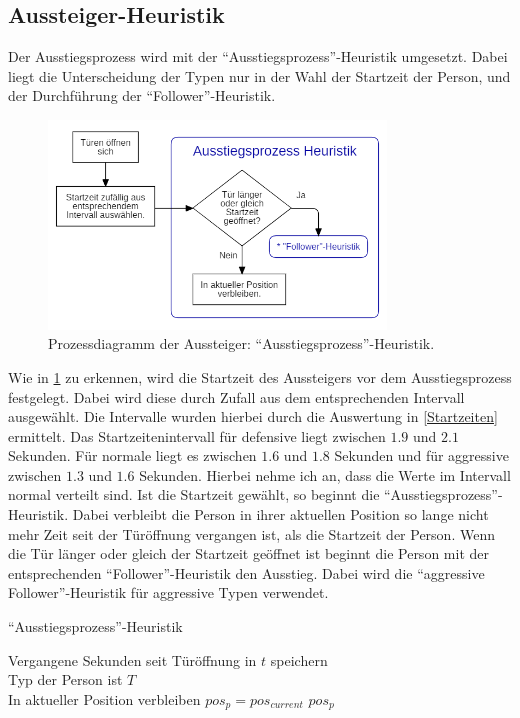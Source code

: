 \subsection{Aussteiger-Heuristik} \label{AM}
Der Ausstiegsprozess wird mit der "`Ausstiegsprozess"'-Heuristik umgesetzt. Dabei liegt die Unterscheidung der Typen nur in der Wahl der Startzeit der Person, und der Durchführung der "`Follower"'-Heuristik.
\begin{figure}[H]
	\centering
		\includegraphics[width=0.8\textwidth]{pictures/model/algorithm/alight/alight_process.png}
	\caption{Prozessdiagramm der Aussteiger: "`Ausstiegsprozess"'-Heuristik.}
	\label{fig:AH}
\end{figure}
Wie in \figurename \ref{fig:AH} zu erkennen, wird die Startzeit des Aussteigers vor dem Ausstiegsprozess festgelegt. Dabei wird diese durch Zufall aus dem entsprechenden Intervall ausgewählt. Die Intervalle wurden hierbei durch die Auswertung in \ref{Startzeiten} ermittelt. Das Startzeitenintervall für defensive liegt zwischen $1.9$ und $2.1$ Sekunden. Für normale liegt es zwischen $1.6$ und $1.8$ Sekunden und für aggressive zwischen $1.3$ und $1.6$ Sekunden. Hierbei nehme ich an, dass die Werte im Intervall normal verteilt sind. Ist die Startzeit gewählt, so beginnt die "`Ausstiegsprozess"'-Heuristik. Dabei verbleibt die Person in ihrer aktuellen Position so lange nicht mehr Zeit seit der Türöffnung vergangen ist, als die Startzeit der Person. Wenn die Tür länger oder gleich der Startzeit geöffnet ist beginnt die Person mit der entsprechenden "`Follower"'-Heuristik den Ausstieg. Dabei wird die "`aggressive Follower"'-Heuristik für aggressive Typen verwendet. 
\clearpage
\begin{algorithm} [H]
	\caption{"`Ausstiegsprozess"'-Heuristik}

	\AlightHeuristic{} {
		Vergangene Sekunden seit Türöffnung in $t$ speichern\\
		Typ der Person ist $T$ \\
		 {
			In aktueller Position verbleiben $pos_{p} = pos_{current}$ 
		} 
		\Return $pos_p$
	}
\end{algorithm}

